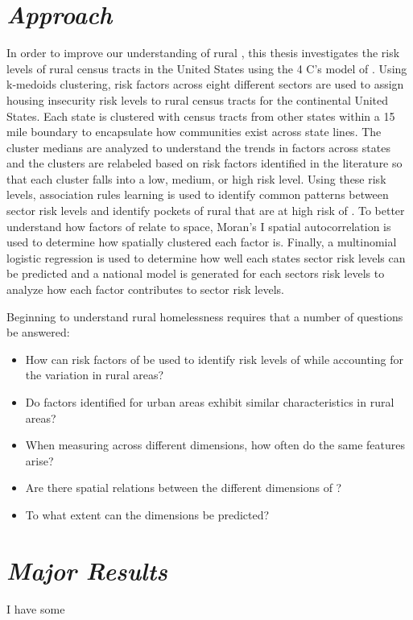 \section{\textit{Approach}}
In order to improve our understanding of rural \hs, this thesis investigates the risk levels of rural census tracts in the United States  using the 4 C's model of \hs. Using k-medoids clustering, risk factors across eight different sectors are used to assign housing insecurity risk levels to rural census tracts for the continental United States. Each state is clustered with census tracts from other states within a 15 mile boundary to encapsulate how communities exist across state lines. The cluster medians are analyzed to understand the trends in \hs factors across states and the clusters are relabeled based on risk factors identified in the literature so that each cluster falls into a low, medium, or high risk level. Using these risk levels, association rules learning is used to identify common patterns between sector risk levels and identify pockets of rural \ct that are at high risk of \hs. To better understand how factors of \hs relate to space, Moran's I spatial autocorrelation is used to determine how spatially clustered each \hs factor is. Finally, a multinomial logistic regression is used to determine how well each states sector risk levels can be predicted and a national model is generated for each sectors risk levels to analyze how each \hs factor contributes to sector risk levels. 

Beginning to understand rural homelessness requires that a number of questions be answered:
\begin{itemize}
    \item How can risk factors of  be used to identify risk levels of \hs while accounting for the variation in rural areas? 
    \item Do \hs factors identified for urban areas exhibit similar characteristics in rural areas? 
    \item When measuring \hs across different dimensions, how often do the same features arise?
    \item Are there spatial relations between the different dimensions of \hs? 
    \item To what extent can the \hs dimensions be predicted? 

\end{itemize}
\section{\textit{Major Results}}
I have some

